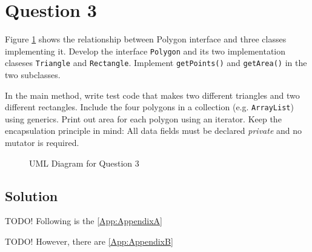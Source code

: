 \section{Question 3}

Figure \ref{fig3} shows the relationship between Polygon interface and three classes implementing it.
Develop the interface \texttt{Polygon} and its two implementation claseses \texttt{Triangle} and \texttt{Rectangle}.
Implement \texttt{getPoints()} and \texttt{getArea()} in the two subclasses.

In the main method, write test code that makes two different triangles and two different rectangles.
Include the four polygons in a collection (e.g. \texttt{ArrayList}) using generics.
Print out area for each polygon using an iterator.
Keep the encapsulation principle in mind: All data fields must be declared \textit{private} and no mutator is required.

\begin{figure}[H]
\centering
\caption{UML Diagram for Question 3}\label{fig3}
\end{figure}

\subsection*{Solution}

TODO! Following is the \ref{App:AppendixA}

TODO! However, there are \ref{App:AppendixB}

